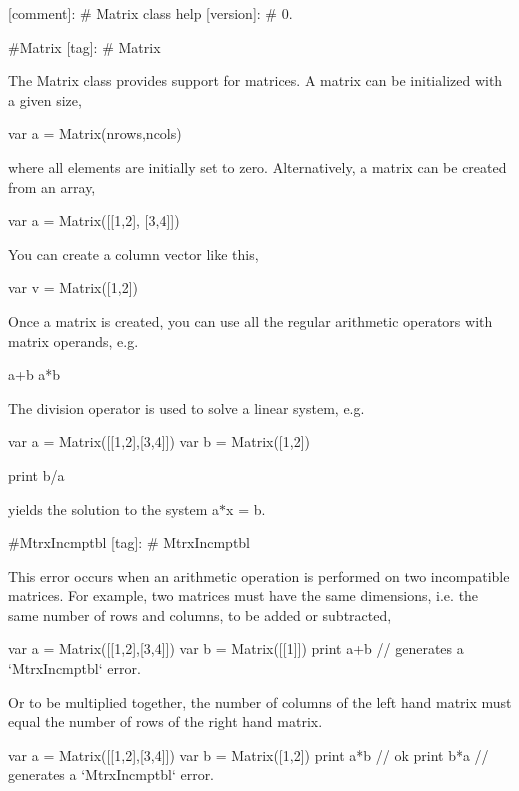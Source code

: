 \mbox{[}comment\mbox{]}\+: \# Matrix class help \mbox{[}version\mbox{]}\+: \# 0.

\#\+Matrix \mbox{[}tag\mbox{]}\+: \# Matrix

The Matrix class provides support for matrices. A matrix can be initialized with a given size, \begin{DoxyVerb}var a = Matrix(nrows,ncols)
\end{DoxyVerb}


where all elements are initially set to zero. Alternatively, a matrix can be created from an array, \begin{DoxyVerb}var a = Matrix([[1,2], [3,4]])
\end{DoxyVerb}


You can create a column vector like this, \begin{DoxyVerb}var v = Matrix([1,2])
\end{DoxyVerb}


Once a matrix is created, you can use all the regular arithmetic operators with matrix operands, e.\+g. \begin{DoxyVerb}a+b
a*b
\end{DoxyVerb}


The division operator is used to solve a linear system, e.\+g. \begin{DoxyVerb}var a = Matrix([[1,2],[3,4]])
var b = Matrix([1,2])

print b/a
\end{DoxyVerb}


yields the solution to the system a$\ast$x = b.

\#\+Mtrx\+Incmptbl \mbox{[}tag\mbox{]}\+: \# Mtrx\+Incmptbl

This error occurs when an arithmetic operation is performed on two \textquotesingle{}incompatible\textquotesingle{} matrices. For example, two matrices must have the same dimensions, i.\+e. the same number of rows and columns, to be added or subtracted, \begin{DoxyVerb}var a = Matrix([[1,2],[3,4]])
var b = Matrix([[1]])
print a+b // generates a `MtrxIncmptbl` error.
\end{DoxyVerb}


Or to be multiplied together, the number of columns of the left hand matrix must equal the number of rows of the right hand matrix. \begin{DoxyVerb}var a = Matrix([[1,2],[3,4]])
var b = Matrix([1,2])
print a*b // ok
print b*a // generates a `MtrxIncmptbl` error.
\end{DoxyVerb}
 